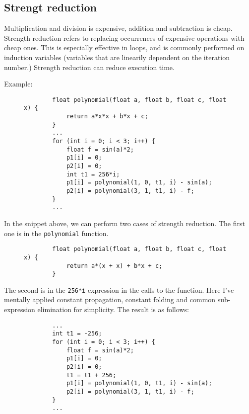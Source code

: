\documentclass[twoside]{article}
\begin{document}
    \newpage
    \subsection{Strengt reduction}

    Multiplication and division is expensive, addition and subtraction is cheap.
    Strength reduction refers to replacing occurrences of expensive operations with cheap ones.
    This is especially effective in loops, and is commonly performed on induction variables (variables that are linearily dependent on the iteration number.)
    Strength reduction can reduce execution time.

    Example:

    \begin{figure}[h!]
        \centering
        \begin{verbatim}
        float polynomial(float a, float b, float c, float x) {
            return a*x*x + b*x + c;
        }
        ...
        for (int i = 0; i < 3; i++) {
            float f = sin(a)*2;
            p1[i] = 0;
            p2[i] = 0;
            int t1 = 256*i;
            p1[i] = polynomial(1, 0, t1, i) - sin(a);
            p2[i] = polynomial(3, 1, t1, i) - f;
        }
        ...
        \end{verbatim}
    \end{figure}

    In the snippet above, we can perform two cases of strength reduction. The first one is in the \texttt{polynomial} function.


    \begin{figure}[h!]
        \centering
        \begin{verbatim}
        float polynomial(float a, float b, float c, float x) {
            return a*(x + x) + b*x + c;
        }
        \end{verbatim}
    \end{figure}

    The second is in the \texttt{256*i} expression in the calls to the function. 
    Here I've mentally applied constant propagation, constant folding and common sub-expression elimination for simplicity.
    The result is as follows:

    \begin{figure}[h!]
        \centering
        \begin{verbatim}
        ...
        int t1 = -256;
        for (int i = 0; i < 3; i++) {
            float f = sin(a)*2;
            p1[i] = 0;
            p2[i] = 0;
            t1 = t1 + 256;
            p1[i] = polynomial(1, 0, t1, i) - sin(a);
            p2[i] = polynomial(3, 1, t1, i) - f;
        }
        ...
        \end{verbatim}
    \end{figure}
\end{document}
